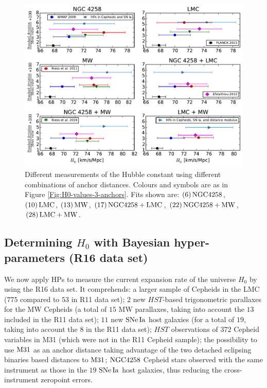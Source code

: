 \begin{figure}[hbtp]
\centering
\includegraphics[width=\textwidth]{figures/chapter-h0/H0_values_anchor_combination.pdf}
\caption{Different measurements of the Hubble constant using different combinations of anchor distances. Colours and symbols are as in Figure \ref{Fig:H0-values-3-anchors}. Fits shown are: $(6)\,\mathrm{NGC4258}$, $(10)\,\mathrm{LMC}$, $(13)\,\mathrm{MW}$, $(17)\,\mathrm{NGC4258}+\mathrm{LMC}$, $(22)\,\mathrm{NGC4258}+\mathrm{MW}$, $(28)\,\mathrm{LMC}+\mathrm{MW}$.}
\label{Fig:single-combined-anchor}
\end{figure}

\subsection{Determining $H_0$ with Bayesian hyper-parameters (R16 data set)}
\label{Subsection:combining-anchors-R16}

We now apply HPs to measure the current expansion rate of the universe $H_0$ by using the R16 data set. It comprehends: 
a larger sample of Cepheids in the LMC ($775$ compared to $53$ in R11 data set); $2$ new $\mathit{HST}$-based trigonometric parallaxes for the MW Cepheids (a total of $15$ MW parallaxes, taking into account the $13$ included in the R11 data set); $11$ new $\mathrm{SNe\,Ia}$ host galaxies (for a total of $19$, taking into account the $8$ in the R11 data set); $\mathit{HST}$ observations of $372$ Cepheid variables in M31 (which were not in the R11 Cepheid sample); the possibility to use $\mathrm{M31}$ as an anchor distance taking advantage of the two detached eclipsing binaries based distances to $\mathrm{M31}$; $\mathrm{NGC4258}$ Cepheid stars observed with the same instrument as those in the $19$ $\mathrm{SNe\,Ia}$ host galaxies, thus reducing the cross-instrument zeropoint errors.   

